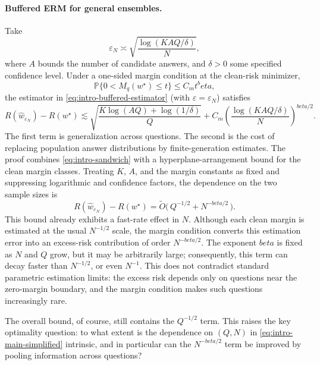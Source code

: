 \documentclass[11pt]{article}
\def\beta{beta}%
\newcommand{\Pp}{\mathbb P}
\newcommand{\eps}{\varepsilon}
\begin{document}
\paragraph{Buffered ERM for general ensembles.}
Take
\[
\eps_N
\asymp
\sqrt{\frac{\log(KAQ/\delta)}{N}},
\]
where $A$ bounds the number of candidate answers, and $\delta > 0$ some specified confidence level.  Under a one-sided margin condition at the clean-risk minimizer,
\[
\Pp\{0<M_q(w^\star)\le t\}
\le C_m t^\beta,
\]
the estimator in \eqref{eq:intro-buffered-estimator} (with $\eps=\eps_N$) satisfies
\begin{equation}
\label{eq:intro-main}
R(\widehat w_{\eps_N})-R(w^\star)
\lesssim
\sqrt{\frac{K\log(AQ)+\log(1/\delta)}{Q}}
+
C_m\left(\frac{\log(KAQ/\delta)}{N}\right)^{\beta/2}.
\end{equation}
The first term is generalization across questions.  The second is the cost of replacing population answer distributions by finite-generation estimates.  The proof combines \eqref{eq:intro-sandwich} with a hyperplane-arrangement bound for the clean margin classes.
Treating $K$, $A$, and the margin constants as fixed and suppressing logarithmic and confidence factors, the dependence on the two sample sizes is
\begin{equation}
\label{eq:intro-main-simplified}
R(\widehat w_{\eps_N})-R(w^\star)
=
\widetilde O\bigl(\, Q^{-1/2}+N^{-\beta/2}\, \bigr).
\end{equation}
This bound already exhibits a fast-rate effect in $N$.  Although each clean margin is estimated at the usual $N^{-1/2}$ scale, the margin condition converts this estimation error into an excess-risk contribution of order $N^{-\beta/2}$.  The exponent $\beta$ is fixed as $N$ and $Q$ grow, but it may be arbitrarily large; consequently, this term can decay faster than $N^{-1/2}$, or even $N^{-1}$.  This does not contradict standard parametric estimation limits: the excess risk depends only on questions near the zero-margin boundary, and the margin condition makes such questions increasingly rare.

The overall bound, of course, still contains the $Q^{-1/2}$ term.
This raises the key optimality question: to what extent is the dependence on $(Q,N)$ in \eqref{eq:intro-main-simplified} intrinsic, and in particular can the $N^{-\beta/2}$ term be improved by pooling information across questions?
\end{document}
